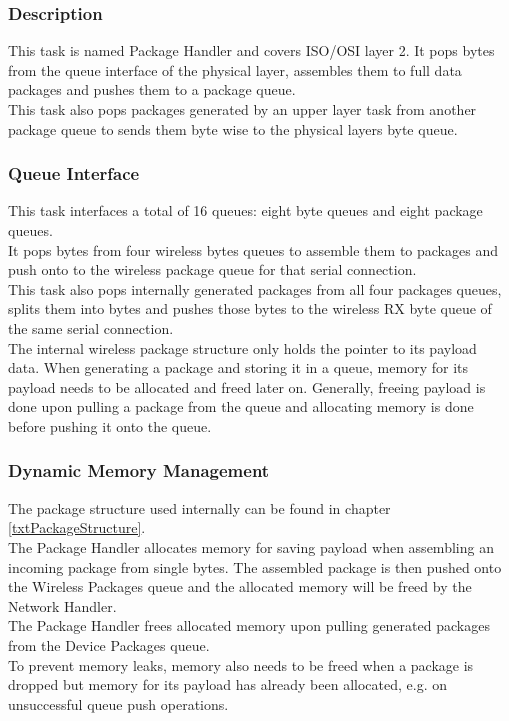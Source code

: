 \subsubsection{Description}
This task is named Package Handler and covers ISO/OSI layer 2. It pops bytes from the queue interface of the physical layer, assembles them to full data packages and pushes them to a package queue.\\
This task also pops packages generated by an upper layer task from another package queue to sends them byte wise to the physical layers byte queue.
\subsubsection{Queue Interface}
This task interfaces a total of 16 queues: eight byte queues and eight package queues.\\
It pops bytes from four wireless bytes queues to assemble them to packages and push onto to the wireless package queue for that serial connection.\\
This task also pops internally generated packages from all four packages queues, splits them into bytes and pushes those bytes to the wireless RX byte queue of the same serial connection.\\
The internal wireless package structure only holds the pointer to its payload data. When generating a package and storing it in a queue, memory for its payload needs to be allocated and freed later on. Generally, freeing payload is done upon pulling a package from the queue and allocating memory is done before pushing it onto the queue.
\subsubsection{Dynamic Memory Management}
The package structure used internally can be found in chapter \ref{txtPackageStructure}.\\
The Package Handler allocates memory for saving payload when assembling an incoming package from single bytes. The assembled package is then pushed onto the Wireless Packages queue and the allocated memory will be freed by the Network Handler.\\
The Package Handler frees allocated memory upon pulling generated packages from the Device Packages queue.\\
To prevent memory leaks, memory also needs to be freed when a package is dropped but memory for its payload has already been allocated, e.g. on unsuccessful queue push operations.
